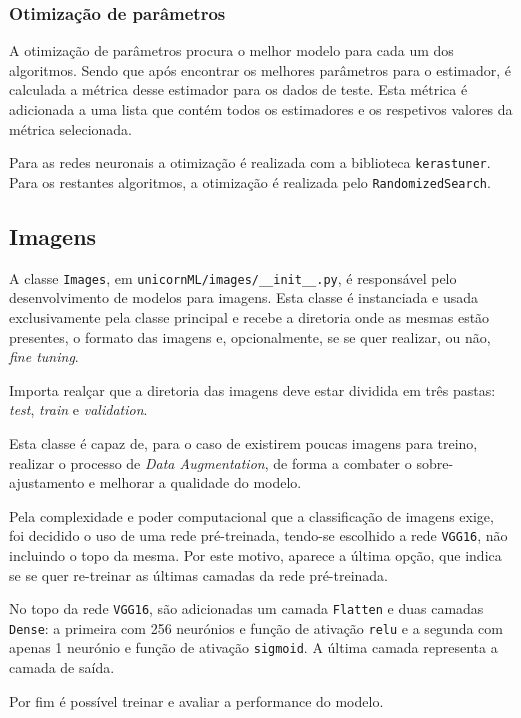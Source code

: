 \documentclass[a4paper]{report}
\begin{document}
{			\subsubsection{Otimização de parâmetros} \label{sssec::optimization}
			A otimização de parâmetros procura o melhor modelo para cada um dos algoritmos.
			Sendo que após encontrar os melhores parâmetros para o estimador, é calculada a métrica desse estimador para os dados de teste.
			Esta métrica é adicionada a uma lista que contém todos os estimadores e os respetivos valores da métrica selecionada.

			Para as redes neuronais a otimização é realizada com a biblioteca \texttt{kerastuner}. Para os restantes algoritmos, a otimização é realizada pelo \texttt{RandomizedSearch}.


		\subsection{Imagens}
		A classe \texttt{Images}, em \texttt{unicornML/images/\_\_init\_\_.py}, é responsável pelo desenvolvimento de modelos para imagens.
		Esta classe é instanciada e usada exclusivamente pela classe principal e recebe a diretoria onde as mesmas estão presentes, o formato das imagens e, opcionalmente, se se quer realizar, ou não, \textit{fine tuning}.

		Importa realçar que a diretoria das imagens deve estar dividida em três pastas: \textit{test}, \textit{train} e \textit{validation}.

		Esta classe é capaz de, para o caso de existirem poucas imagens para treino, realizar o processo de \textit{Data Augmentation}, de forma a combater o sobre-ajustamento e melhorar a qualidade do modelo.

		Pela complexidade e poder computacional que a classificação de imagens exige, foi decidido o uso de uma rede pré-treinada, tendo-se escolhido a rede \texttt{VGG16}, não incluindo o topo da mesma.
		Por este motivo, aparece a última opção, que indica se se quer re-treinar as últimas camadas da rede pré-treinada.

		No topo da rede \texttt{VGG16}, são adicionadas um camada \texttt{Flatten} e duas camadas \texttt{Dense}: a primeira com 256 neurónios e função de ativação \texttt{relu} e a segunda com apenas 1 neurónio e função de ativação \texttt{sigmoid}.
		A última camada representa a camada de saída.

		Por fim é possível treinar e avaliar a performance do modelo.
}
\end{document}

